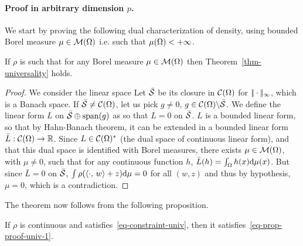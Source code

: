 \paragraph{Proof in arbitrary dimension $p$.}

We start by proving the following dual characterization of density, using bounded Borel measure $\mu \in \mathcal{M}(\Omega)$ i.e. such that $\mu(\Omega)<+\infty$.

\begin{prop}\label{prop-proof-univ-1}
	If $\rho$ is such that for any Borel measure $\mu \in \mathcal{M}(\Omega)$
	then Theorem~\ref{thm-universality} holds. 
\end{prop}

\begin{proof}
	We consider the linear space
	Let $\bar{\mathcal{S}}$ be its closure in $\mathcal{C}(\Omega)$ for $|\!| \cdot |\!|_\infty$, which is a Banach space.
	If $\bar{\mathcal{S}} \neq \mathcal{C}(\Omega)$, let us pick $g \neq 0$, $g \in \mathcal{C}(\Omega) \backslash \bar{\mathcal{S}}$.
	We define the linear form $L$ on $\bar{\mathcal{S}} \oplus \text{span}(g)$ as
	so that $L=0$ on $\bar{\mathcal{S}}$. $L$ is a bounded linear form, so that by Hahn-Banach theorem, it can be extended in a bounded linear form $\bar L : \mathcal{C}(\Omega) \rightarrow \mathbb{R}$. Since $L \in \mathcal{C}(\Omega)^*$ (the dual space of continuous linear form), and that this dual space is identified with Borel measures, there exists $\mu \in \mathcal{M}(\Omega)$, with $\mu \neq 0$, such that for any continuous function $h$, $\bar L(h) = \int_\Omega h(x) \mathrm{d}\mu(x)$.
	But since $\bar L = 0$ on $\bar{\mathcal{S}}$, $\int \rho(\langle \cdot,\,w\rangle+z) \mathrm{d} \mu = 0$ for all $(w,z)$ and thus by hypothesis, $\mu=0$, which is a contradiction.
\end{proof}

The theorem now follows from the following proposition.

\begin{prop}
	If $\rho$ is continuous and satisfies~\eqref{eq-constraint-univ}, then it satisfies~\eqref{eq-prop-proof-univ-1}.
\end{prop}

